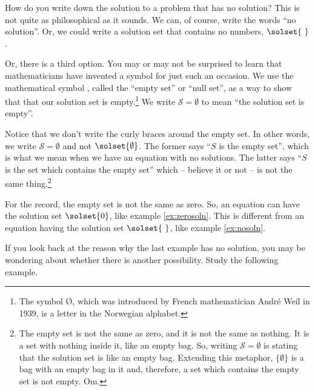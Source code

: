 How do you write down the solution to a problem that has no solution? This is not quite as philosophical as it sounds. We can, of course, write the words ``no solution''. Or, we could write a solution set that contains no numbers, $\solset{~}$.

Or, there is a third option. You may or may not be surprised to learn that mathematicians have invented a symbol for just such an occasion. We use the mathematical symbol \emptyset, called the ``empty set'' or ``null set'', as a way to show that that our solution set is empty.\footnote{The symbol \O, which was introduced by French mathematician Andr\'e Weil in 1939, is a letter in the Norwegian alphabet.} We write $\mathcal{S} = \emptyset$ to mean ``the solution set is empty''.

Notice that we don't write the curly braces around the empty set. In other words, we write $\mathcal{S}=\emptyset$ and not $\solset{\emptyset}$. The former says ``$S$ is the empty set'', which is what we mean when we have an equation with no solutions. The latter says ``$S$ is the set which contains the empty set'' which -- believe it or not -- is not the same thing.\footnote{The empty set is not the same as zero, and it is not the same as nothing. It is a set with nothing inside it, like an empty bag. So, writing $\mathcal{S} = \emptyset$ is stating that the solution set is like an empty bag. Extending this metaphor, $\{\emptyset\}$ is a bag with an empty bag in it and, therefore, a set which contains the empty set is not empty. Om.}

For the record, the empty set is not the same as zero. So, an equation can have the solution set $\solset{0}$, like example \cref{ex:zerosoln}. This is different from an equation having the solution set $\solset{~}$, like example \cref{ex:nosoln}.

If you look back at the reason why the last example has no solution, you may be wondering about whether there is another possibility. Study the following example.

